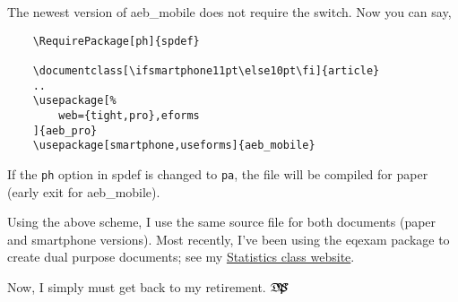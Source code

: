 \documentclass{article}
\def\dps{$\hbox{$\mathfrak D$\kern-.3em\hbox{$\mathfrak P$}%
   \kern-.6em \hbox{$\mathcal S$}}$}
\begin{document}
The newest version of \textsf{aeb\_mobile} does not require the
 switch. Now you can say,
\begin{verbatim}
    \RequirePackage[ph]{spdef}

    \documentclass[\ifsmartphone11pt\else10pt\fi]{article}
    ..
    \usepackage[%
        web={tight,pro},eforms
    ]{aeb_pro}
    \usepackage[smartphone,useforms]{aeb_mobile}
\end{verbatim}
If the \texttt{ph} option in \textsf{spdef} is changed to \texttt{pa}, the
file will be compiled for paper (early exit for \textsf{aeb\_mobile}).


Using the above scheme, I use the same source file for both documents
(paper and smartphone versions). Most recently, I've been using
the \textsf{eqexam} package to create dual purpose documents; see my
\href{http://faculty.nwfsc.edu/web/math/storyd/class/spr12/STA2023/}{Statistics class website}.

Now, I simply must get back to my retirement. \dps
\end{document}
